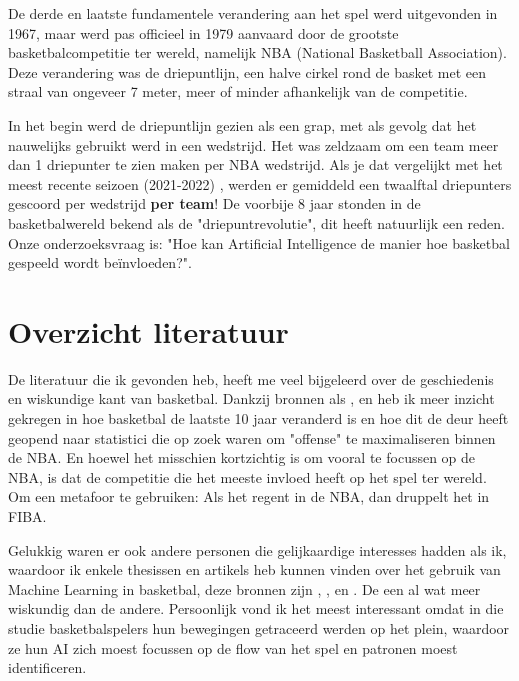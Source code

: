 \documentclass{hogent-article}
\begin{document}
De derde en laatste fundamentele verandering aan het spel werd uitgevonden in 1967, maar werd pas officieel in 1979 aanvaard door de grootste basketbalcompetitie ter wereld, namelijk NBA (National Basketball Association). Deze verandering was de driepuntlijn, een halve cirkel rond de basket met een straal van ongeveer 7 meter, meer of minder afhankelijk van de competitie.

In het begin werd de driepuntlijn gezien als een grap, met als gevolg dat het nauwelijks gebruikt werd in een wedstrijd. Het was zeldzaam om een team meer dan 1 driepunter te zien maken per NBA wedstrijd. Als je dat vergelijkt met het meest recente seizoen (2021-2022) \autocite{Reynolds2021}, werden er gemiddeld een twaalftal driepunters gescoord per wedstrijd \textbf{per team}! De voorbije 8 jaar stonden in de basketbalwereld bekend als de "driepuntrevolutie", dit heeft natuurlijk een reden. Onze onderzoeksvraag is: "Hoe kan Artificial Intelligence de manier hoe basketbal gespeeld wordt beïnvloeden?".
\section{Overzicht literatuur}
De literatuur die ik gevonden heb, heeft me veel bijgeleerd over de geschiedenis en wiskundige kant van basketbal. Dankzij bronnen als \autocite{Reynolds2021}, \autocite{Schuhmann2021} en \autocite{Sprawball2019} heb ik meer inzicht gekregen in hoe basketbal de laatste 10 jaar veranderd is en hoe dit de deur heeft geopend naar statistici die op zoek waren om "offense" te maximaliseren binnen de NBA. En hoewel het misschien kortzichtig is om vooral te focussen op de NBA, is dat de competitie die het meeste invloed heeft op het spel ter wereld. Om een metafoor te gebruiken: Als het regent in de NBA, dan druppelt het in FIBA. 

Gelukkig waren er ook andere personen die gelijkaardige interesses hadden als ik, waardoor ik enkele thesissen en artikels heb kunnen vinden over het gebruik van Machine Learning in basketbal, deze bronnen zijn \autocite{BinXinyang2021}, \autocite{Narayan2019}, \autocite{Woo2018} en \autocite{Tian2019}. De een al wat meer wiskundig dan de andere. Persoonlijk vond ik \autocite{Tian2019} het meest interessant omdat in die studie basketbalspelers hun bewegingen getraceerd werden op het plein, waardoor ze hun AI zich moest focussen op de flow van het spel en patronen moest identificeren.
\end{document}
